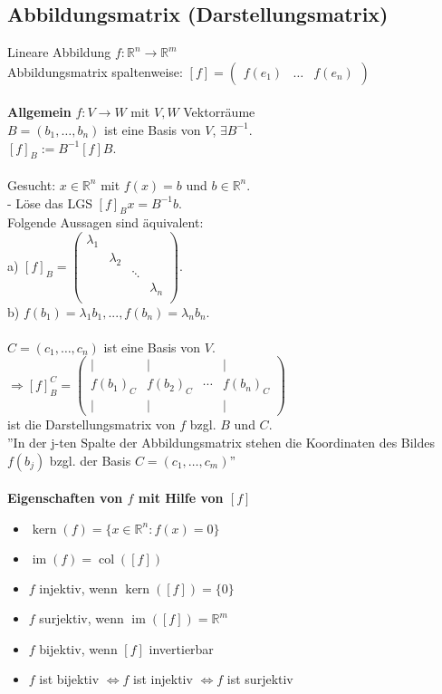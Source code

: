 \documentclass[german, 6pt]{latex4ei/latex4ei_sheet}
\DeclareMathOperator{\im}{im}
\DeclareMathOperator{\col}{col}
\DeclareMathOperator{\Kern}{kern}
\begin{document}
\subsection{Abbildungsmatrix (Darstellungsmatrix)}
Lineare Abbildung $f:\mathbb{R}^n \rightarrow \mathbb{R}^m$ \\
Abbildungsmatrix spaltenweise:
$[f] = \begin{pmatrix}f(e_1) & \dots & f(e_n)
\end{pmatrix} $ \\ \\
\textbf{Allgemein} $f:V\rightarrow W$ mit $V, W$ Vektorräume \\
$B=(b_1,\dots,b_n)$ ist eine Basis von $V$, $\exists B^{-1}$. \\
$[f]_B := B^{-1}[f]B$.\\ \\
Gesucht: $x \in\mathbb{R}^n$ mit $f(x) = b$ und $b\in\mathbb{R}^n$.\\
- Löse das LGS $[f]_Bx = B^{-1}b$.\\
Folgende Aussagen sind äquivalent:\\
a) $[f]_B = \begin{pmatrix}
\lambda_1 & & & \\
& \lambda_2 & & \\
& & \ddots & \\
& & & \lambda_n \\ 
\end{pmatrix}$.\\
b) $f(b_1) = \lambda_1b_1, ..., f(b_n) = \lambda_nb_n$.\\ \\

$C=(c_1,\dots,c_n)$ ist eine Basis von $V$. \\
$\Rightarrow [f]_B^C = \begin{pmatrix}
\vert & \vert &  & \vert \\
f(b_1)_C & f(b_2)_C & \cdots & f(b_n)_C\\
\vert & \vert &  & \vert
\end{pmatrix}$ \\
ist die Darstellungsmatrix von $f$ bzgl. $B$ und $C$. \\
''In der j-ten Spalte der Abbildungsmatrix stehen die Koordinaten des Bildes $f(b_j)$ bzgl. der Basis $C=(c_1,\dots,c_m)$'' \\ \\
\textbf{Eigenschaften von $f$ mit Hilfe von $[f]$}
\begin{itemize}\itemsep0pt
\item $\Kern(f) = \{ x\in\mathbb{R}^n : f(x) = 0 \}$
\item $\im(f) = \col([f])$
\item $f$ injektiv, wenn $\Kern([f])=\{0\}$
\item $f$ surjektiv, wenn $\im([f])=\mathbb{R}^m$
\item $f$ bijektiv, wenn $[f]$ invertierbar
\item $f$ ist bijektiv $\Leftrightarrow f$ ist injektiv $\Leftrightarrow f$ ist surjektiv
\end{itemize}
\end{document}
